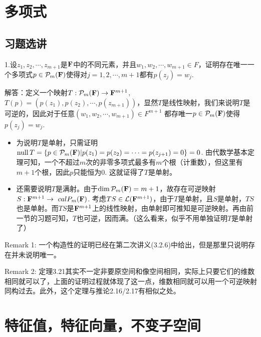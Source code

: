 \documentclass[hyperref,]{ctexart}
\begin{document}
\bigskip

\section{多项式}\label{ux591aux9879ux5f0f}

\subsection{习题选讲}\label{ux4e60ux9898ux9009ux8bb2-1}

\noindent{}1.设\(z_1,z_2,\cdots,z_{m+1}\)是\(\mathbf{F}\)中的不同元素，并且\(w_1,w_2,\cdots,w_{m+1}\in F\)，证明存在唯一一个多项式\(p\in \mathcal{P}_m(\mathbf{F})\)使得对\(j=1,2,\cdots,m+1\)都有\(p(z_j)=w_j\).

\smallskip

\noindent{}解答：定义一个映射\(T:\mathcal{P}_m(\mathbf{F})\rightarrow \mathbf{F}^{m+1}\),
\(T(p) = (p(z_1),p(z_2),\cdots,p(z_{m+1}))\)，显然\(T\)是线性映射，我们来说明\(T\)是可逆的，因此对于任意\((w_1,w_2,\cdots,w_{m+1})\in F^{m+1}\)
都存唯一\(p\in\mathcal{P}_m(\mathbf{F})\)使得\(p(z_j)=w_j\).

\begin{itemize}
\item
  为说明\(T\)是单射，只需证明\(\mathrm{null}\, T=\{p\in\mathcal{P}_m(\mathbf{F})| p(z_1)=p(z_2)=\cdots=p(z_{j+1})=0\}={0}\).
  由代数学基本定理可知，一个不超过\(m\)次的非零多项式最多有\(m\)个根（计重数），但这里有\(m+1\)个根，因此\(p\)只能恒为\(0\).
  这就证得了\(T\)是单射。
\item
  还需要说明\(T\)是满射。由于\(\mathrm{dim}\, \mathcal{P}_m(\mathbf{F})=m+1\)，故存在可逆映射\(S:\mathbf{F}^{m+1}\rightarrow\ calP_m(\mathbf{F})\).
  考虑\(TS\in\mathcal{L}(\mathbf{F}^{m+1})\)，由于\(T\)是单射，且\(S\)是单射，\(TS\)也是单射。而\(TS\)是\(\mathbf{F}^{m+1}\)上的线性映射，由单射即可推知是可逆映射。再由前一节的习题可知，\(T\)也可逆，因而满。（这么看来，似乎不用单独证明\(T\)是单射了）
\end{itemize}

\noindent{}Remark 1:
一个构造性的证明已经在第二次讲义(3.2.6)中给出，但是那里只说明存在并未说明唯一。

\noindent{}Remark 2:
定理3.21其实不一定非要原空间和像空间相同，实际上只要它们的维数相同就可以了，上面的证明过程就体现了这一点，维数相同就可以用一个可逆映射同构过去。此外，这个定理与推论2.16/2.17有相似之处。

\section{特征值，特征向量，不变子空间}\label{ux7279ux5f81ux503cux7279ux5f81ux5411ux91cfux4e0dux53d8ux5b50ux7a7aux95f4}
\end{document}
